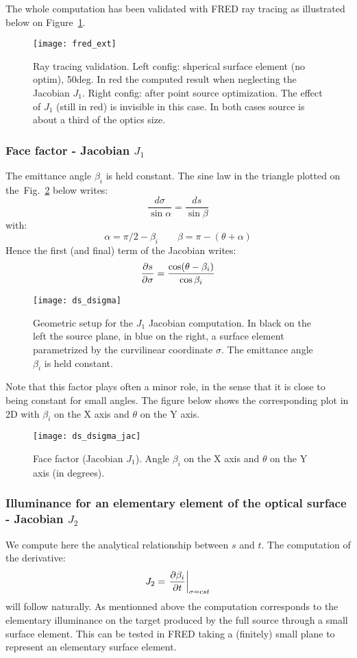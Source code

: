 The whole computation has been validated with FRED ray tracing as illustrated
below on Figure~\ref{fig:fred_ext}.
\begin{figure}
\centering
\texttt{[image: fred\_ext]} 
\caption{Ray tracing validation. Left config: shperical surface element (no optim), 50deg.
In red the computed result when neglecting the Jacobian $J_1$. Right config:
after point source optimization. The effect of $J_1$ (still in red)
 is invisible in this case.
 In both cases source is about a third of the optics size.
}
\label{fig:fred_ext}
\end{figure}

\subsubsection*{Face factor - Jacobian $J_1$}
The emittance angle $\beta_i$ is held constant.
The sine law in the triangle plotted on the~Fig.~\ref{fig:ds_dsigma} below writes:
\[ \frac{d\sigma}{\sin\alpha} = \frac{ds}{\sin\beta}\]
with:
\[ \alpha = \pi/2 - \beta_i \quad \quad \beta = \pi - (\theta+\alpha)\]
Hence the first (and final) term of the Jacobian writes:
\[ \frac{\partial{s}}{\partial{\sigma}} = \frac{\cos(\theta-\beta_i)}{\cos\beta_i} \]

\begin{figure}[!htbp]
\centering
\texttt{[image: ds\_dsigma]} 
\caption{Geometric setup for the $J_1$ Jacobian computation. In black
on the left the source plane, in blue on the right, a surface element parametrized
by the curvilinear coordinate $\sigma$. The emittance angle $\beta_i$ is held constant.}
\label{fig:ds_dsigma}
\end{figure}

Note that this factor plays often a minor role, in the sense that it is close
to being constant for small angles.
The figure below shows the corresponding plot in 2D with $\beta_i$ on the X axis
and $\theta$ on the Y axis.

\begin{figure}[!htbp]
\centering
\texttt{[image: ds\_dsigma\_jac]} 
\caption{Face factor (Jacobian $J_1$). Angle $\beta_i$ on the X axis
and $\theta$ on the Y axis (in degrees).}
\label{fig:ds_dsigma_jac}
\end{figure}


\subsubsection*{Illuminance for an elementary element of the 
optical surface - Jacobian $J_2$}
We compute here the analytical relationship between $s$
and $t$. The computation of the derivative:
\[J_2 = \left. \frac{\partial{\beta_i}}{\partial{t}} \right|_{\sigma=cst}\]
 will follow naturally.
As mentionned above the computation corresponds to the elementary illuminance
on the target produced by the full source through a small surface
element. This can be tested in FRED taking a (finitely) small plane
to represent an elementary surface element.

